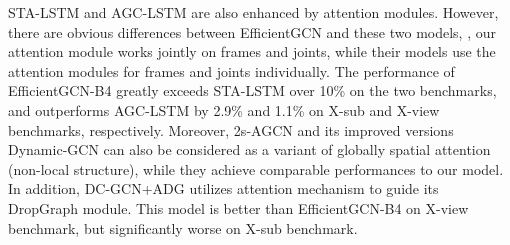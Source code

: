\documentclass[10pt,journal,compsoc]{IEEEtran}
\begin{document}
STA-LSTM \cite{song2017end} and AGC-LSTM \cite{si2019attention} are also enhanced by attention modules. However, there are obvious differences between EfficientGCN and these two models, \eg, our attention module works jointly on frames and joints, while their models use the attention modules for frames and joints individually. The performance of EfficientGCN-B4 greatly exceeds STA-LSTM over 10\% on the two benchmarks, and outperforms AGC-LSTM by 2.9\% and 1.1\% on X-sub and X-view benchmarks, respectively. Moreover, 2s-AGCN and its improved versions Dynamic-GCN \cite{ye2020dynamic} can also be considered as a variant of globally spatial attention (non-local structure), while they achieve comparable performances to our model. In addition, DC-GCN+ADG \cite{cheng2020decoupling} utilizes attention mechanism to guide its DropGraph module. This model is better than EfficientGCN-B4 on X-view benchmark, but significantly worse on X-sub benchmark.
\end{document}
